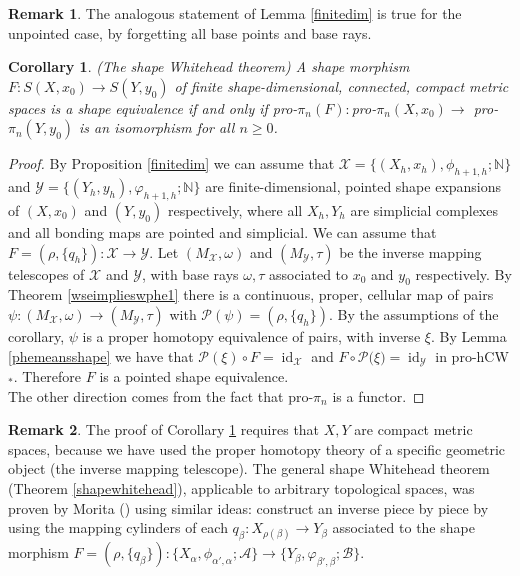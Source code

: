 \documentclass[a4paper,11pt]{article}
\theoremstyle{definition}
\newtheorem*{remark}{Remark}
\theoremstyle{plain}
\newtheorem{cor}[definition]{Corollary}
\theoremstyle{remark}
\DeclareMathOperator{\id}{id}
\begin{document}
{\begin{remark}
The analogous statement of Lemma \ref{finitedim} is true for the unpointed case, by forgetting all base points and base rays.  
\end{remark}


\begin{cor} \label{wseimplieswphe2} (The shape Whitehead theorem) A shape morphism $F:S(X,x_{0})\rightarrow S(Y, y_0)$ of finite shape-dimensional, connected, compact metric spaces is a shape equivalence if and only if pro-$\pi_{n}(F):$pro-$\pi_{n}(X,x_0)\rightarrow$ pro-$\pi_{n}(Y,y_0)$ is an isomorphism for all $n\geq 0$. 
\end{cor}

\begin{proof} By Proposition \ref{finitedim} we can assume that $\mathcal{X}=\{(X_{h},x_{h}),\phi_{h+1,h};\mathbb{N}\}$ and $\mathcal{Y}=\{(Y_{h},y_{h}),\varphi_{h+1,h};\mathbb{N}\}$ are finite-dimensional, pointed shape expansions of $(X,x_0)$ and $(Y,y_0)$ respectively, where all $X_{h},Y_{h}$ are simplicial complexes and all bonding maps are pointed and simplicial. We can assume that $F= (\rho,\{q_{h}\}): \mathcal{X}\rightarrow \mathcal{Y}$. Let $(M_{\mathcal{X}},\omega)$ and $(M_{\mathcal{Y}},\tau)$ be the inverse mapping telescopes of $\mathcal{X}$ and $\mathcal{Y}$, with base rays $\omega,\tau$ associated to $x_0$ and $y_0$ respectively. By Theorem \ref{wseimplieswphe1} there is a continuous, proper, cellular map of pairs $\psi: (M_{\mathcal{X}},\omega) \rightarrow (M_{\mathcal{Y}},\tau)$ with $\mathcal{P}(\psi) = (\rho,\{q_{h}\})$. By the assumptions of the corollary, $\psi$ is a proper homotopy equivalence of pairs, with inverse $\xi$. By Lemma \ref{phemeansshape} we have that $\mathcal{P}(\xi)\circ F = \id_{\mathcal{X}}$ and $F\circ \mathcal{P}(\mathcal{\xi)} = \id_{\mathcal{Y}}$ in pro-hCW$_{\ast}$. Therefore $F$ is a pointed shape equivalence. \\

The other direction comes from the fact that pro-$\pi_{n}$ is a functor.  
\end{proof}

\begin{remark}
The proof of Corollary \ref{wseimplieswphe2} requires that $X,Y$ are compact metric spaces, because we have used the proper homotopy theory of a specific geometric object (the inverse mapping telescope). The general shape Whitehead theorem (Theorem \ref{shapewhitehead}), applicable to arbitrary topological spaces, was proven by Morita (\cite{morita1974hurewicz}) using similar ideas: construct an inverse piece by piece by using the mapping cylinders of each $q_{\beta}: X_{\rho(\beta)}\rightarrow Y_{\beta}$ associated to the shape morphism $F=(\rho,\{q_{\beta}\}): \{X_{\alpha}, \phi_{\alpha',\alpha}; \mathcal{A}\} \rightarrow \{Y_{\beta}, \varphi_{\beta',\beta}; \mathcal{B}\}$. 
\end{remark}

}
\end{document}
